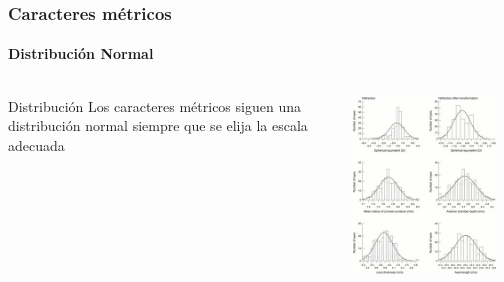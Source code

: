 \documentclass{beamer}
\newenvironment{caja}
{
\begin{beamerboxesrounded}[upper=upcol,lower=lowcol,shadow=true]}
{\end{beamerboxesrounded}}
\begin{document}
\begin{frame}
\frametitle{Caracteres métricos}
\framesubtitle{Distribución Normal}
\begin{columns}
\begin{column}{0.4\textwidth}
\begin{caja}{Distribución}
Los caracteres métricos siguen una distribución normal siempre que se elija la escala adecuada
\end{caja}
\end{column}

\begin{column}{0.5\textwidth}
\includegraphics[width=0.9\textwidth]{fotos/distribucion.jpg}
\end{column}
\end{columns}
\end{frame}
\end{document}
